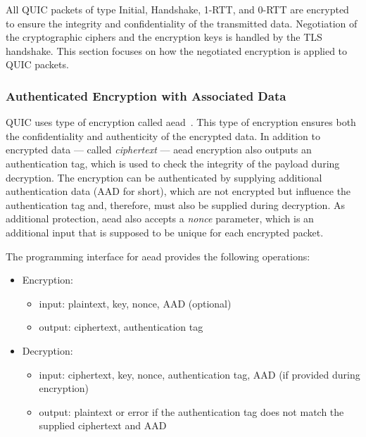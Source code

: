 All QUIC packets of type Initial, Handshake, 1-RTT, and 0-RTT are encrypted to ensure the integrity
and confidentiality of the transmitted data. Negotiation of the cryptographic ciphers and the
encryption keys is handled by the TLS handshake. This section focuses on how the negotiated
encryption is applied to QUIC packets.

\subsubsection{Authenticated Encryption with Associated Data}

QUIC uses type of encryption called \gls{aead}~\cite{rfc5116}. This type of encryption ensures both
the confidentiality and authenticity of the encrypted data. In addition to encrypted data --- called
\textit{ciphertext} --- \gls{aead} encryption also outputs an authentication tag, which is used to check
the integrity of the payload during decryption. The encryption can be authenticated by supplying
additional authentication data (AAD for short), which are not encrypted but influence the
authentication tag and, therefore, must also be supplied during decryption. As additional
protection, \gls{aead} also accepts a \textit{nonce} parameter, which is an additional input that is
supposed to be unique for each encrypted packet.

The programming interface for \gls{aead} provides the following operations:

\begin{itemize}

  \item Encryption:

  \begin{itemize}

    \item input: plaintext, key, nonce, AAD (optional)

    \item output: ciphertext, authentication tag

  \end{itemize}

  \item Decryption:

  \begin{itemize}

    \item input: ciphertext, key, nonce, authentication tag, AAD (if provided during encryption)

    \item output: plaintext or error if the authentication tag does not match the supplied
ciphertext and AAD

  \end{itemize}

\end{itemize}

